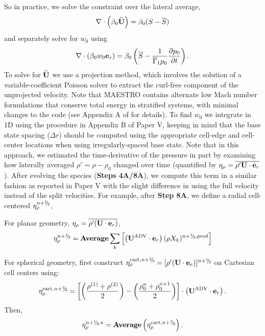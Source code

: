 So in practice, we solve the constraint over the lateral average,
\begin{equation}
\nabla\cdot\left(\beta_0\Ubt\right) = \beta_0(S-\overline{S})
\end{equation}
and separately solve for $w_0$ using 
\begin{equation}
\nabla\cdot(\beta_0w_0\eb_r) = \beta_0\left(\overline{S} - \frac{1}{\gammaonebar p_0}\frac{\partial p_0}{\partial t}\right).
\end{equation}
To solve for $\widetilde{{\bf{U}}}$ we use a projection method, which involves the solution of a variable-coefficient Poisson solver to extract the curl-free component of the unprojected velocity.
Note that MAESTRO contains alternate low Mach number formulations that conserve total energy in stratified systems, with minimal changes to the code (see Appendix A of \cite{subChandra_II} for details).
To find $w_0$ we integrate in 1D using the procedure in Appendix B of Paper V, keeping in mind that the base state spacing ($\Delta r$) should be computed using the appropriate cell-edge and cell-center locations when using irregularly-spaced base state.
Note that in this approach, we estimated the time-derivative of the pressure in part by examining how laterally averaged $\rho'=\rho-\rho_0$ changed over time (quantified by $\eta_\rho = \overline{\rho'{\bf{U}}\cdot{\bf{e}}_r}$).  After evolving the species ({\bf Steps 4A/8A}), we compute this term in a similar fashion as reported in Paper V with the slight difference in using the full velocity instead of the split velocities. For example, after {\bf Step 8A}, we define a radial cell-centered $\etarho^{\nph}$, 

\begin{description}
\item For planar geometry, $\eta_\rho = \overline{\rho'({\bf{U}}\cdot{\bf{e}}_r)}$,
\begin{equation}
 \etarho^{\nph} =  {\rm {\bf Average}} \sum_k \left[ \left(\uadvtwo \cdot \eb_r \right) (\rho X_k)^{\nph,\pred} \right]
\end{equation}
\item For spherical geometry, first construct 
$\etarho^{{\rm cart},\nph} = [\rho'(\Ub\cdot\eb_r)]^{\nph}$ on Cartesian cell centers using:
\begin{equation}
\etarho^{{\rm cart},\nph} = \left[\left(\frac{\rho^{(1)}+\rho^{(2)}}{2}\right)-\left(\frac{\rho_0^n+\rho_0^{n+1}}{2}\right)\right] \cdot \left( \uadvtwo \cdot \eb_r \right).
\end{equation}
Then,
\begin{equation}
\etarho^{\nph,\star} = {\rm {\bf Average}}\left(\etarho^{{\rm cart},\nph}\right).
\end{equation}
\end{description}



